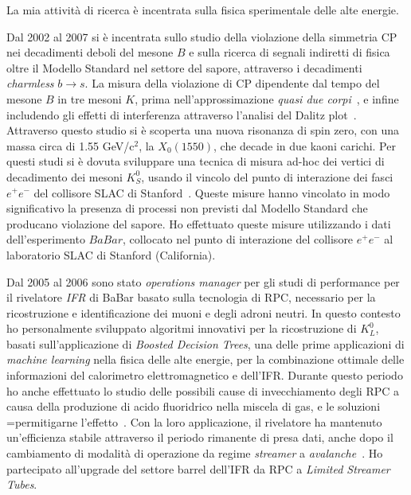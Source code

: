 \documentclass[11pt,twoside,a4paper]{article}
\begin{document}
La mia attivit\`a di ricerca \`e incentrata sulla fisica sperimentale
delle alte energie.

Dal 2002 al 2007 si \`e incentrata sullo studio della violazione della
simmetria CP nei decadimenti deboli del mesone $B$ e sulla ricerca di
segnali indiretti di fisica oltre il Modello Standard nel settore del
sapore, attraverso i decadimenti \textit{charmless} $b \to s$.  La
misura della violazione di CP dipendente dal tempo del mesone $B$ in
tre mesoni $K$, prima nell'approssimazione \textit{quasi due
  corpi}~\cite{Aubert:2008rr}, e infine includendo gli effetti di
interferenza attraverso l'analisi del Dalitz
plot~\cite{Aubert:2007sd,Aubert:2007me}. Attraverso questo studio si
\`e scoperta una nuova risonanza di spin zero, con una massa circa di
1.55 GeV/c$^2$, la $X_0(1550)$, che decade in due kaoni carichi. Per
questi studi si \`e dovuta sviluppare una tecnica di misura ad-hoc dei
vertici di decadimento dei mesoni $K^0_S$, usando il vincolo del punto
di interazione dei fasci $e^+e^-$ del collisore SLAC di
Stanford~\cite{Aubert:2005dy,Aubert:2005gj}.  Queste misure hanno
vincolato in modo significativo la presenza di processi non previsti
dal Modello Standard che producano violazione del sapore.  Ho
effettuato queste misure utilizzando i dati dell'esperimento $BaBar$,
collocato nel punto di interazione del collisore $e^+e^-$ al
laboratorio SLAC di Stanford (California).

Dal 2005 al 2006 sono stato \textit{operations manager} per gli studi
di performance per il rivelatore \textit{IFR} di BaBar basato sulla
tecnologia di RPC, necessario per la ricostruzione e identificazione
dei muoni e degli adroni neutri. In questo contesto ho personalmente
sviluppato algoritmi innovativi per la ricostruzione di $K^0_L$,
basati sull'applicazione di \textit{Boosted Decision Trees}, una delle
prime applicazioni di \textit{machine learning} nella fisica delle
alte energie, per la combinazione ottimale delle informazioni del
calorimetro elettromagnetico e dell'IFR. Durante questo periodo ho
anche effettuato lo studio delle possibili cause di invecchiamento
degli RPC a causa della produzione di acido fluoridrico nella miscela
di gas, e le soluzioni =permitigarne
l'effetto~\cite{Band:2008zza}. Con la loro applicazione, il rivelatore
ha mantenuto un'efficienza stabile attraverso il periodo rimanente di
presa dati, anche dopo il cambiamento di modalit\`a di operazione da
regime \textit{streamer} a
\textit{avalanche}~\cite{Band:2006ig,Anulli:2005wi}. Ho partecipato
all'upgrade del settore barrel dell'IFR da RPC a \textit{Limited
  Streamer Tubes}.
\end{document}
